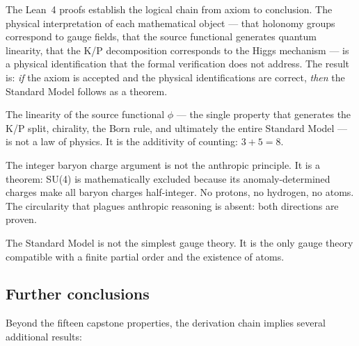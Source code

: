 \documentclass[11pt,letterpaper]{article}
\begin{document}
The Lean~4 proofs establish the logical chain from axiom to
conclusion.  The physical interpretation of each mathematical
object --- that holonomy groups correspond to gauge fields, that
the source functional generates quantum linearity, that the K/P
decomposition corresponds to the Higgs mechanism --- is a physical
identification that the formal verification does not address.  The
result is: \emph{if} the axiom is accepted and the physical
identifications are correct, \emph{then} the Standard Model
follows as a theorem.

The linearity of the source functional $\phi$ --- the single property
that generates the K/P split, chirality, the Born rule, and ultimately
the entire Standard Model --- is not a law of physics.  It is the
additivity of counting: $3 + 5 = 8$.

The integer baryon charge argument is not the anthropic principle.
It is a theorem: SU(4) is mathematically excluded because its
anomaly-determined charges make all baryon charges half-integer.
No protons, no hydrogen, no atoms.  The circularity that plagues
anthropic reasoning is absent: both directions are proven.

The Standard Model is not the simplest gauge theory.  It is the only
gauge theory compatible with a finite partial order and the existence
of atoms.

\subsection{Further conclusions}

Beyond the fifteen capstone properties, the derivation chain implies
several additional results:
\end{document}
